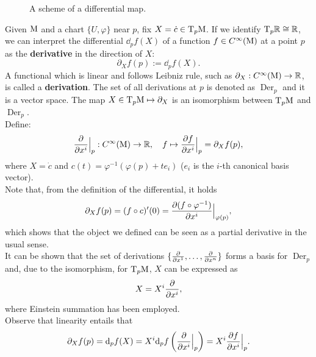 \begin{figure}[h]
	\label{fig:differential}
	\caption{A scheme of a differential map.}
	
\end{figure}

	\noindent Given $\mathrm{M}$ and a chart $\{U, \varphi\}$ near $p$, fix $X=\dot{c}\in\mathrm{T}_p\mathrm{M}$. If we identify $\mathrm{T}_p{\mathbb R}\cong{\mathbb R}$, we can interpret the differential $\dd_p f(X)$ of a function $f\in C^\infty(\mathrm{M})$ at a point $p$ as the \textbf{derivative} in the direction of $X$:
\[	\partial_X f(p):=\dd_p f(X).	\]
A functional which is linear and follows Leibniz rule, such as $\partial_X:C^\infty(\mathrm{M})\to{\mathbb R}$, is called a \textbf{derivation}. The set of all derivations at $p$ is denoted as $\operatorname{Der}_p$ and it is a vector space. The map $X\in\mathrm{T}_p\mathrm{M}\mapsto\partial_X$ is an isomorphism between $\mathrm{T}_p\mathrm{M}$ and $\operatorname{Der}_p$.\\
Define:
\[	\frac{\partial  }{\partial x^i}\Big|_p:C^\infty(\mathrm{M})\to{\mathbb R},\quad f\mapsto\frac{\partial f}{\partial x^i}\Big|_p=\partial_X f(p),	\]
where $X=\dot{c}$ and $c(t)=\varphi^{-1}(\varphi(p)+te_i)$ ($e_i$ is the $i$-th canonical basis vector).\\
Note that, from the definition of the differential, it holds
\[ \partial_X f(p)=(f\circ c)'(0)=\frac{\partial (f\circ \varphi^{-1})}{\partial x^i}\Big|_{\varphi(p)},\]
which shows that the object we defined can be seen as a partial derivative in the usual sense.\\
It can be shown that the set of derivations $\{\frac{\partial  }{\partial x^1},\dots,\frac{\partial  }{\partial x^n}\}$ forms a basis for $\operatorname{Der}_p$ and, due to the isomorphism, for $\mathrm{T}_p\mathrm{M}$, $X$ can be expressed as
\[	X=X^i\frac{\partial  }{\partial x^i},	\]
where Einstein summation has been employed.\\
Observe that linearity entails that
\[	\partial_X f(p)=\mathrm d_p f(X)=X^i\mathrm d_p f\left(\frac{\partial }{\partial x^i}\Big|_p\right)=X^i\frac{\partial f}{\partial x^i}\Big|_p.		\]

